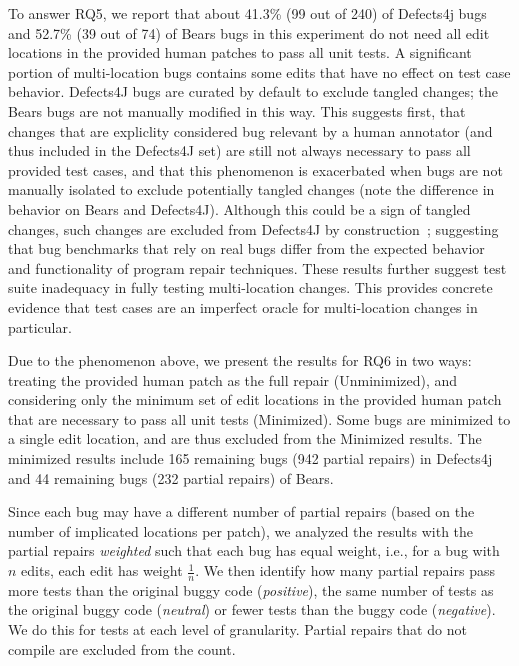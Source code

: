 \documentclass[sigconf, timestamp-false, anonymous=true]{acmart}
\begin{document}
To answer RQ5, we report that about 41.3\%  (99 out of 240) of Defects4j bugs and 52.7\% (39 out of 74) of
Bears bugs in this experiment do not need all edit locations in the provided human patches 
to pass
all unit tests. A significant portion of multi-location bugs contains some
edits that have no effect on test case behavior.  Defects4J bugs are curated by
default to exclude tangled changes; the Bears bugs are not manually modified in
this way.  This suggests first, that changes that are expliclity considered bug
relevant by a human annotator (and thus included in the Defects4J set) are still
not always necessary to pass all provided test cases, and that this phenomenon
is exacerbated when bugs are not manually isolated to exclude potentially tangled
changes (note the difference in behavior on Bears and Defects4J).  
Although this could
be a sign of tangled changes, such changes are excluded from Defects4J by
construction~\cite{defects4j}; suggesting
that bug benchmarks that rely on real bugs differ from the expected behavior and 
functionality of program repair techniques.  These results further suggest test
suite inadequacy in fully testing multi-location
changes. This provides concrete evidence that
test cases are an imperfect oracle for multi-location changes in particular. 

Due to the phenomenon above, we present the results for RQ6 in two ways:
treating the provided human patch as the full repair
(Unminimized), and considering only the minimum set of edit locations in the
provided human patch that are necessary
to pass all unit tests (Minimized).
Some bugs are minimized to a single edit location, and are thus excluded 
from the Minimized results. The minimized results 
include 165 remaining bugs (942 partial repairs) in Defects4j and 44 remaining bugs (232 partial repairs) of Bears. 

Since each bug may have a different 
number of partial repairs (based on the number of implicated locations per
patch), we analyzed the results with the partial repairs \emph{weighted} such that each bug
has equal weight, i.e., for a bug with $n$ edits, each edit has weight 
$\frac{1}{n}$.  We then identify how many partial repairs pass more tests
than the original buggy code (\emph{positive}), the  same number of tests as the
original buggy code (\emph{neutral}) or fewer tests than the buggy code
(\emph{negative}).  We do this for tests at each level of granularity.  Partial
repairs that do not compile are
excluded from the count. 
\end{document}
